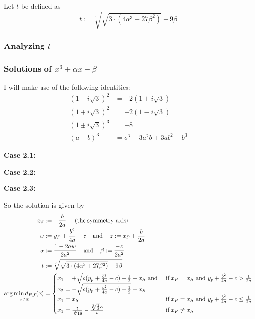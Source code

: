 Let $t$ be defined as
\[t := \sqrt[3]{\sqrt{3 \cdot (4 \alpha^3 + 27 \beta^2)} -9\beta}\]

\subsubsection{Analyzing $t$}


\subsubsection{Solutions of $x^3 + \alpha x + \beta$}
I will make use of the following identities:
\begin{align*}
    (1-i \sqrt{3})^2     &= -2 (1+i \sqrt{3})\\
    (1+i \sqrt{3})^2     &= -2 (1-i \sqrt{3})\\
    (1 \pm i \sqrt{3})^3 &= -8\\
    (a-b)^3              &= a^3-3 a^2 b+3 a b^2-b^3
\end{align*}

\textbf{Case 2.1:}

\goodbreak
\textbf{Case 2.2:}


\textbf{Case 2.3:}


\goodbreak
So the solution is given by
\begin{align*}
x_S &:= - \frac{b}{2a} \;\;\;\;\; \text{(the symmetry axis)}\\
w &:= y_P+\frac{b^2}{4a}-c \;\;\; \text{ and } \;\;\; z := x_P+\frac{b}{2a}\\
\alpha &:= \frac{1- 2 aw}{2 a^2} \;\;\;\text{ and }\;\;\; \beta := \frac{-z}{2 a^2}\\
t &:= \sqrt[3]{\sqrt{3 \cdot (4 \alpha^3 + 27 \beta^2)} -9\beta}\\
\underset{x\in\mathbb{R}}{\arg \min d_{P,f}(x)} &= \begin{cases}
     x_1 = +\sqrt{a (y_p + \frac{b^2}{4a} - c) - \frac{1}{2}} + x_S \text{ and }   &\text{if } x_P = x_S \text{ and } y_p + \frac{b^2}{4a} - c >  \frac{1}{2a} \\
     x_2 = -\sqrt{a (y_p + \frac{b^2}{4a} - c) - \frac{1}{2}} + x_S\\
     x_1 = x_S   &\text{if } x_P = x_S \text{ and } y_p + \frac{b^2}{4a} - c \leq  \frac{1}{2a} \\
     x_1 = \frac{t}{\sqrt[3]{18}} - \frac{\sqrt[3]{\frac{2}{3}} \alpha }{t}   &\text{if } x_P \neq x_S
    \end{cases}
\end{align*}
\clearpage

